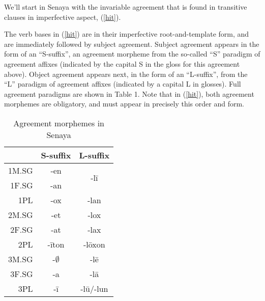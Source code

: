 \documentclass[output=paper
,modfonts
,nonflat]{langsci/langscibook}
\begin{document}
We'll start in Senaya with the invariable agreement that is found in transitive clauses in imperfective aspect, (\ref{hit}).

\eal \label{hit}
\zl


\noindent The verb bases in (\ref{hit}) are in their imperfective root-and-template form, and are immediately followed by subject agreement. Subject agreement appears in the form of an ``S-suffix'', an agreement morpheme from the so-called ``S'' paradigm of agreement affixes (indicated by the capital S in the gloss for this agreement above). Object agreement appears next, in the form of an ``L-suffix'', from the ``L'' paradigm of agreement affixes (indicated by a capital L in glosses). Full agreement paradigms are shown in Table 1. Note that in (\ref{hit}), both agreement morphemes are obligatory, and must appear in precisely this order and form. 


\pagebreak

\begin{table}
\caption{Agreement morphemes in Senaya}

\begin{tabular}[h!]{|r||c|c|}
\hline
      & S-suffix                               & L-suffix               \\ \hline \hline
1{\small M.SG}   & -en                             & \multirow{2}{*}{-l\=i}             \\ \cline{1-1} \cline{2-2} 
1{\small F.SG}   & -an                              &              \\ \hline
1{\small PL}   & -ox                              & -lan             \\ \hline
2{\small M.SG} & -et & -lox \\  \hline
2{\small F.SG} &       -at             & -lax             \\ \hline
2{\small PL}   & -\=iton                             & {-l\=oxon}             \\ \hline
3{\small M.SG} & -$\emptyset$   & -l\=e              \\ \hline
3{\small F.SG} &          -a                        & -l\=a              \\ \hline
3{\small PL}   &         -\=i                         & {-l\=u/-lun}             \\ \hline
\end{tabular}

\end{table}
\end{document}
